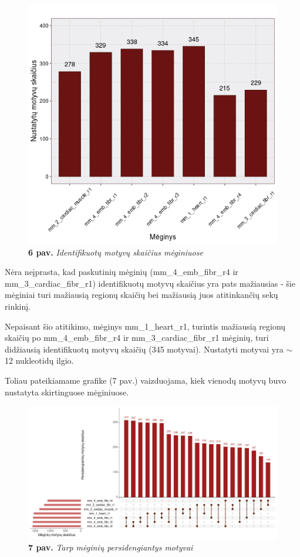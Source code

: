 \documentclass[12pt]{article}
\begin{document}
\begin{figure}[htb]
    \begin{center}
        \includegraphics[width=0.7\linewidth]{../Figures/motifs_in_samples.png}
        \caption*{\textbf{6 pav.} \emph{Identifikuotų motyvų skaičius
                                        mėginiuose}}
    \end{center}
\end{figure}

Nėra neįprasta, kad paskutinių mėginių (mm\_4\_emb\_fibr\_r4 ir
mm\_3\_cardiac\_fibr\_r1) identifikuotų motyvų skaičius yra pats mažiausias -
šie mėginiai turi mažiausią regionų skaičių bei mažiausią juos atitinkančių
sekų rinkinį.

Nepaisant šio atitikimo, mėginys mm\_1\_heart\_r1, turintis mažiausią regionų
skaičių po mm\_4\_emb\_fibr\_r4 ir mm\_3\_cardiac\_fibr\_r1 mėginių, turi
didžiausią identifikuotų motyvų skaičių (345 motyvai). Nustatyti motyvai yra
\(\sim\)12 nukleotidų ilgio.

Toliau pateikiamame grafike (7 pav.) vaizduojama, kiek vienodų motyvų buvo
nustatyta skirtinguose mėginiuose.

\newpage

\begin{figure}[htb]
    \begin{center}
        \includegraphics[width=1\linewidth]{../Figures/motif_intersections.png}
        \caption*{\textbf{7 pav.} \emph{Tarp mėginių persidengiantys motyvai}}
    \end{center}
\end{figure}
\end{document}
